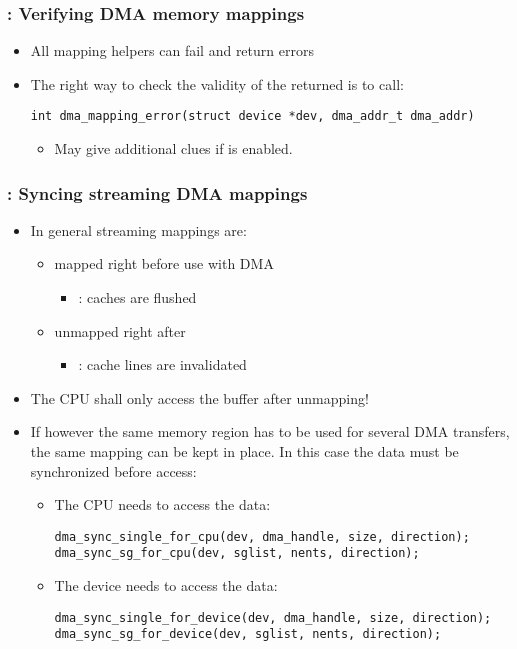 \begin{frame}[fragile]
  \frametitle{: Verifying DMA memory mappings}
  \begin{itemize}
  \item All mapping helpers can fail and return errors
  \item The right way to check the validity of the returned
     is to call:
\begin{verbatim}
int dma_mapping_error(struct device *dev, dma_addr_t dma_addr)
\end{verbatim}
    \begin{itemize}
    \item May give additional clues if  is
      enabled.
    \end{itemize}
  \end{itemize}
\end{frame}

\begin{frame}[fragile]
  \frametitle{: Syncing streaming DMA mappings}
  \begin{itemize}
  \item In general streaming mappings are:
    \begin{itemize}
    \item mapped right before use with DMA
      \begin{itemize}
      \item {}: caches are flushed
      \end{itemize}
    \item unmapped right after
      \begin{itemize}
      \item {}: cache lines are invalidated
      \end{itemize}
    \end{itemize}
  \item The CPU shall only access the buffer after unmapping!
  \item If however the same memory region has to be used for several DMA
    transfers, the same mapping can be kept in place. In this case the
    data must be synchronized before access:
    \begin{itemize}
    \item The CPU needs to access the data:
\begin{verbatim}
dma_sync_single_for_cpu(dev, dma_handle, size, direction);
dma_sync_sg_for_cpu(dev, sglist, nents, direction);
\end{verbatim}
    \item The device needs to access the data:
\begin{verbatim}
dma_sync_single_for_device(dev, dma_handle, size, direction);
dma_sync_sg_for_device(dev, sglist, nents, direction);
\end{verbatim}
    \end{itemize}
  \end{itemize}
\end{frame}


